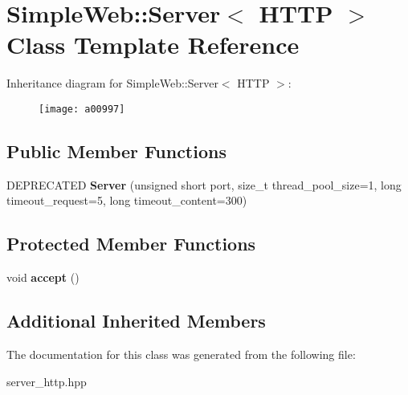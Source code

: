 \hypertarget{a00997}{}\section{Simple\+Web\+:\+:Server$<$ H\+T\+TP $>$ Class Template Reference}
\label{a00997}
Inheritance diagram for Simple\+Web\+:\+:Server$<$ H\+T\+TP $>$\+:\begin{figure}[H]
\begin{center}
\leavevmode
\texttt{[image: a00997]}
\end{center}
\end{figure}
\subsection*{Public Member Functions}
\begin{DoxyCompactItemize}
\item 
\mbox{\label{a00997_a926e5ebedafc2d17a944698197b7f002}} 
D\+E\+P\+R\+E\+C\+A\+T\+ED {\bfseries Server} (unsigned short port, size\+\_\+t thread\+\_\+pool\+\_\+size=1, long timeout\+\_\+request=5, long timeout\+\_\+content=300)
\end{DoxyCompactItemize}
\subsection*{Protected Member Functions}
\begin{DoxyCompactItemize}
\item 
\mbox{\label{a00997_abe9f9de361dcb01541e0302eac21986d}} 
void {\bfseries accept} ()
\end{DoxyCompactItemize}
\subsection*{Additional Inherited Members}


The documentation for this class was generated from the following file\+:\begin{DoxyCompactItemize}
\item 
server\+\_\+http.\+hpp\end{DoxyCompactItemize}
